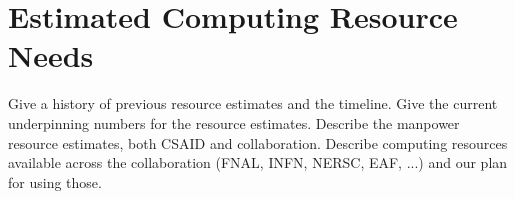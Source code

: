 \section{Estimated Computing Resource Needs}
\label{sec:resources}
Give a history of previous resource estimates and the timeline.
Give the current underpinning numbers for the resource estimates.
Describe the manpower resource estimates, both CSAID and collaboration.
Describe computing resources available across the collaboration (FNAL, INFN, NERSC, EAF, ...) and our plan for using those.
